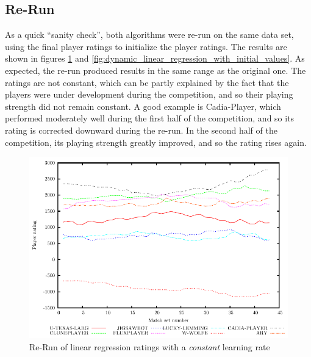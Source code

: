 \documentclass[a4paper,10pt]{article}
\begin{document}
\subsection{Re-Run}
As a quick ``sanity check'', both algorithms were re-run on the same data set, using the final player ratings to initialize the player ratings. The results are shown in figures \ref{fig:constant_linear_regression_with_initial_values} and \ref{fig:dynamic_linear_regression_with_initial_values}. As expected, the re-run produced results in the same range as the original one. The ratings are not constant, which can be partly explained by the fact that the players were under development during the competition, and so their playing strength did not remain constant. A good example is Cadia-Player, which performed moderately well during the first half of the competition, and so its rating is corrected downward during the re-run. In the second half of the competition, its playing strength greatly improved, and so the rating rises again.

\begin{figure}
 \centering
 \includegraphics[width=\textwidth]{constant_linear_regression_1_0_with_initial_values}
 \caption{Re-Run of linear regression ratings with a \textit{constant} learning rate}
 \label{fig:constant_linear_regression_with_initial_values}
\end{figure}
\end{document}
